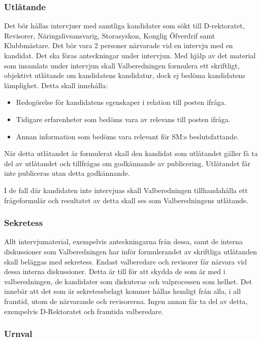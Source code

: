 \documentclass{dgovdoc}
\begin{document}
\subsubsection{Utlåtande}

Det bör hållas intervjuer med samtliga kandidater som sökt till D-rektoratet,
Revisorer, Näringslivsansvarig, Storasyskon, Konglig Öfverdrif samt Klubbmästare.
Det bör vara 2 personer närvarade vid en intervju med en kandidat. Det ska föras
anteckningar under intervjun. Med hjälp av det material som insamlats under
intervjun skall Valberedningen formulera ett skriftligt, objektivt utlåtande om
kandidatens kandidatur, dock ej bedöma kandidatens lämplighet. Detta skall innehålla:

\begin{itemize}
\item Redogörelse för kandidatens egenskaper i relation till posten ifråga.
\item Tidigare erfarenheter som bedöms vara av relevans till posten ifråga.
\item Annan information som bedöms vara relevant för SM:s beslutsfattande.
\end{itemize}

När detta utlåtandet är formulerat skall den kandidat som utlåtandet gäller
få ta del av utlåtandet och tillfrågas om godkännande av publicering.
Utlåtandet får inte publiceras utan detta godkännande.

I de fall där kandidaten inte intervjuas skall Valberedningen tillhandahålla
ett frågeformulär och resultatet av detta skall ses som Valberedningens utlåtande.

\subsubsection{Sekretess}

Allt intervjumaterial, exempelvis anteckningarna från dessa, samt de interna
diskussioner som Valberedningen har inför formulerandet av skriftliga utlåtanden
skall beläggas med sekretess. Endast valberedare och revisorer får närvara vid
dessa interna diskussioner. Detta är till för att skydda de som är med i
valberedningen, de kandidater som diskuteras och valprocessen som helhet.
Det innebär att det som är sekretessbelagt kommer hållas hemligt från alla,
i all framtid, utom de närvarande och revisorerna. Ingen annan får ta del av detta,
exempelvis D-Rektoratet och framtida valberedare.

\subsubsection{Urnval}
\end{document}
